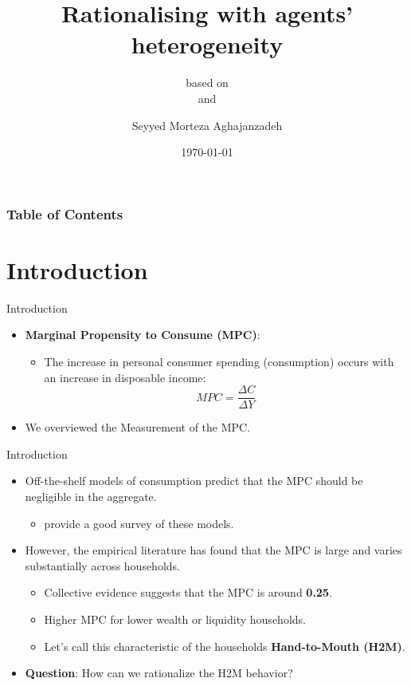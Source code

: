 \documentclass{beamer}
\title[Rationalising with agents’ heterogeneity]{ \textbf{Rationalising with agents’ heterogeneity}}
\subtitle{based on\\ \textit{\cite{aguiar2023hand}} and \textit{\cite{kaplan2014model}}}
\author[Morteza]{Seyyed Morteza Aghajanzadeh}
\institute[HH Finance]{Households Finance}
\date{\today}
\begin{document}
\begin{frame}
    \titlepage
\end{frame}

\begin{frame}
	\frametitle{Table of Contents}
	\tableofcontents[hideallsubsections]
\end{frame}

\section{Introduction}
\begin{frame}{Introduction}
	\begin{itemize}
		\item<1-> \textbf{Marginal Propensity to Consume (MPC)}:
		\begin{itemize}
			\item The increase in personal consumer spending (consumption) occurs with an increase in disposable income:
			\begin{equation*}
				MPC = \frac{\Delta C}{\Delta Y}
			\end{equation*}
		\end{itemize}
		\item<2-> We overviewed the Measurement of the MPC.
	\end{itemize}
\end{frame}

\begin{frame}{Introduction}
	\begin{itemize}
		\item<1-> Off-the-shelf models of consumption predict that the MPC should be negligible in the aggregate. 
		\begin{itemize}
			\item \cite{heathcote2009quantitative} provide a good survey of these models.
		\end{itemize}
		\item<2-> However, the empirical literature has found that the MPC is large and varies substantially across households.
		\begin{itemize}
			\item Collective evidence suggests that the MPC is around \textbf{0.25}.
			\item Higher MPC for lower wealth or liquidity households.
			\item Let's call this characteristic of the households \textbf{Hand-to-Mouth (H2M)}.
		\end{itemize}
		\item<3-> \textbf{Question}: How can we rationalize the H2M behavior?
	\end{itemize}
\end{frame}
\end{document}
